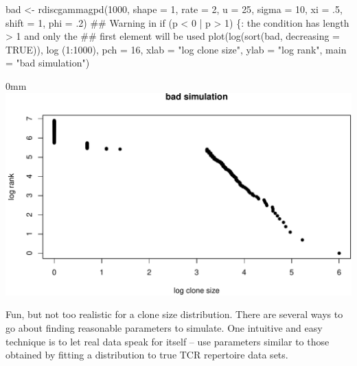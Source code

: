 \documentclass[]{article}
\newcommand{\hlnum}[1]{\textcolor[rgb]{0.816,0.125,0.439}{#1}}%
\newcommand{\hlstr}[1]{\textcolor[rgb]{0.251,0.627,0.251}{#1}}%
\newcommand{\hlstd}[1]{\textcolor[rgb]{0.251,0.251,0.251}{#1}}%
\newcommand{\hlkwc}[1]{\textcolor[rgb]{0.251,0.251,0.251}{#1}}%
\newcommand{\hlkwd}[1]{\textcolor[rgb]{0.878,0.439,0.125}{#1}}%
\newenvironment{Shaded}{\begin{myshaded}}{\end{myshaded}}
\newcommand{\KeywordTok}[1]{\hlkwd{#1}}
\newcommand{\DataTypeTok}[1]{\hlkwc{#1}}
\newcommand{\DecValTok}[1]{\hlnum{#1}}
\newcommand{\StringTok}[1]{\hlstr{#1}}
\newcommand{\OtherTok}[1]{{#1}}
\newcommand{\NormalTok}[1]{\hlstd{#1}}
\theoremstyle{definition}
\theoremstyle{definition}
\theoremstyle{definition}
\theoremstyle{remark}
\begin{document}
\begin{Shaded}
\begin{Highlighting}[]
\NormalTok{bad <-}\StringTok{ }\KeywordTok{rdiscgammagpd}\NormalTok{(}\DecValTok{1000}\NormalTok{, }\DataTypeTok{shape =} \DecValTok{1}\NormalTok{, }\DataTypeTok{rate =} \DecValTok{2}\NormalTok{, }\DataTypeTok{u =} \DecValTok{25}\NormalTok{, }\DataTypeTok{sigma =} \DecValTok{10}\NormalTok{,}
                     \DataTypeTok{xi =} \NormalTok{.}\DecValTok{5}\NormalTok{, }\DataTypeTok{shift =} \DecValTok{1}\NormalTok{, }\DataTypeTok{phi =} \NormalTok{.}\DecValTok{2}\NormalTok{)}
\NormalTok{## Warning in if (p < 0 | p > 1) \{: the condition has length > 1 and only the}
\NormalTok{## first element will be used}
\KeywordTok{plot}\NormalTok{(}\KeywordTok{log}\NormalTok{(}\KeywordTok{sort}\NormalTok{(bad, }\DataTypeTok{decreasing =} \OtherTok{TRUE}\NormalTok{)), }\KeywordTok{log} \NormalTok{(}\DecValTok{1}\NormalTok{:}\DecValTok{1000}\NormalTok{), }\DataTypeTok{pch =} \DecValTok{16}\NormalTok{,}
     \DataTypeTok{xlab =} \StringTok{"log clone size"}\NormalTok{, }\DataTypeTok{ylab =} \StringTok{"log rank"}\NormalTok{, }\DataTypeTok{main =} \StringTok{"bad simulation"}\NormalTok{)}
\end{Highlighting}
\end{Shaded}

\begin{adjustwidth}{\fltoffset}{0mm}
\includegraphics{powerTCR_files/figure-latex/unnamed-chunk-9-1} \end{adjustwidth}

Fun, but not too realistic for a clone size distribution. There are
several ways to go about finding reasonable parameters to simulate. One
intuitive and easy technique is to let real data speak for itself -- use
parameters similar to those obtained by fitting a distribution to true
TCR repertoire data sets.
\end{document}
